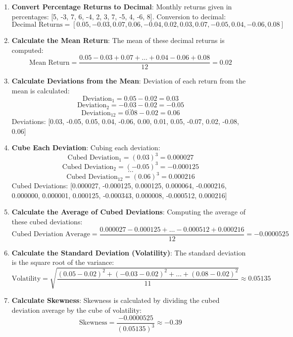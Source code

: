 \documentclass{article}
\begin{document}
\begin{enumerate}
    \item \textbf{Convert Percentage Returns to Decimal}:
    Monthly returns given in percentages: [5, -3, 7, 6, -4, 2, 3, 7, -5, 4, -6, 8]. Conversion to decimal:
    \[ \text{Decimal Returns} = [0.05, -0.03, 0.07, 0.06, -0.04, 0.02, 0.03, 0.07, -0.05, 0.04, -0.06, 0.08] \]

    \item \textbf{Calculate the Mean Return}:
    The mean of these decimal returns is computed:
    \[ \text{Mean Return} = \frac{0.05 - 0.03 + 0.07 + \ldots + 0.04 - 0.06 + 0.08}{12} = 0.02 \]

    \item \textbf{Calculate Deviations from the Mean}:
    Deviation of each return from the mean is calculated:
    \[ \text{Deviation}_1 = 0.05 - 0.02 = 0.03 \] 
    \[ \text{Deviation}_2 = -0.03 - 0.02 = -0.05 \] 
    \[ \ldots \] 
    \[ \text{Deviation}_{12} = 0.08 - 0.02 = 0.06 \]
    Deviations: [0.03, -0.05, 0.05, 0.04, -0.06, 0.00, 0.01, 0.05, -0.07, 0.02, -0.08, 0.06]

    \item \textbf{Cube Each Deviation}:
    Cubing each deviation:
    \[ \text{Cubed Deviation}_1 = (0.03)^3 = 0.000027 \] 
    \[ \text{Cubed Deviation}_2 = (-0.05)^3 = -0.000125 \] 
    \[ \ldots \] 
    \[ \text{Cubed Deviation}_{12} = (0.06)^3 = 0.000216 \]
    Cubed Deviations: [0.000027, -0.000125, 0.000125, 0.000064, -0.000216, 0.000000, 0.000001, 0.000125, -0.000343, 0.000008, -0.000512, 0.000216]

    \item \textbf{Calculate the Average of Cubed Deviations}:
    Computing the average of these cubed deviations:
    \[ \text{Cubed Deviation Average} = \frac{0.000027 - 0.000125 +  \ldots - 0.000512 + 0.000216}{12} = -0.0000525 \]

    \item \textbf{Calculate the Standard Deviation (Volatility)}:
    The standard deviation is the square root of the variance:
    \[ \text{Volatility} = \sqrt{\frac{(0.05 - 0.02)^2 + (-0.03 - 0.02)^2 + \ldots + (0.08 - 0.02)^2}{11}} \approx 0.05135 \]

    \item \textbf{Calculate Skewness}:
    Skewness is calculated by dividing the cubed deviation average by the cube of volatility:
    \[ \text{Skewness} = \frac{-0.0000525}{(0.05135)^3} \approx -0.39 \]
\end{enumerate}
\end{document}
